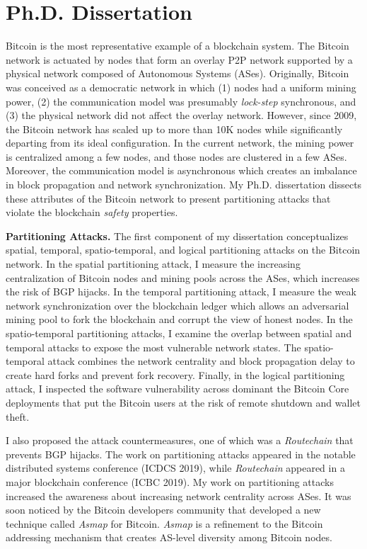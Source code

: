 \documentclass{NSF}
\newcommand{\BfPara}[1]{{\noindent\textbf{#1.}}\xspace}
\begin{document}
\section{Ph.D. Dissertation}
Bitcoin is the most representative example of a blockchain system. The Bitcoin network is actuated by nodes that form an overlay P2P network supported by a physical network composed of Autonomous Systems (ASes). Originally, Bitcoin was conceived as a democratic network in which (1) nodes had a uniform mining power, (2) the communication model was presumably {\em lock-step} synchronous, and (3) the physical network did not affect the overlay network. However, since 2009, the Bitcoin network has scaled up to more than 10K nodes while significantly departing from its ideal configuration. In the current network, the mining power is centralized among a few nodes, and those nodes are clustered in a few ASes. Moreover, the communication model is asynchronous which creates an imbalance in block propagation and network synchronization. My Ph.D. dissertation dissects these attributes of the Bitcoin network to present partitioning attacks that violate the blockchain {\em safety} properties. 





\BfPara{Partitioning Attacks} The first component of my dissertation conceptualizes spatial, temporal, spatio-temporal, and logical partitioning attacks on the Bitcoin network. In the spatial partitioning attack, I measure the increasing centralization of Bitcoin nodes and mining pools across the ASes, which increases the risk of BGP hijacks. In the temporal partitioning attack, I measure the weak network synchronization over the blockchain ledger which allows an adversarial mining pool to fork the blockchain and corrupt the view of honest nodes. In the spatio-temporal partitioning attacks, I examine the overlap between spatial and temporal attacks to expose the most vulnerable network states. The spatio-temporal attack combines the network centrality and block propagation delay to create hard forks and prevent fork recovery. Finally, in the logical partitioning attack, I inspected the software vulnerability across dominant the Bitcoin Core deployments that put the Bitcoin users at the risk of remote shutdown and wallet theft. 

I also proposed the attack countermeasures, one of which was a {\em Routechain} that prevents BGP hijacks. The work on partitioning attacks appeared in the notable distributed systems conference (ICDCS 2019), while {\em Routechain} appeared in a major blockchain conference (ICBC 2019). My work on partitioning attacks increased the awareness about increasing network centrality across ASes. It was soon noticed by the Bitcoin developers community that developed a new technique called {\em Asmap} for Bitcoin. {\em Asmap} is a refinement to the Bitcoin addressing mechanism that creates AS-level diversity among Bitcoin nodes. 
\end{document}
